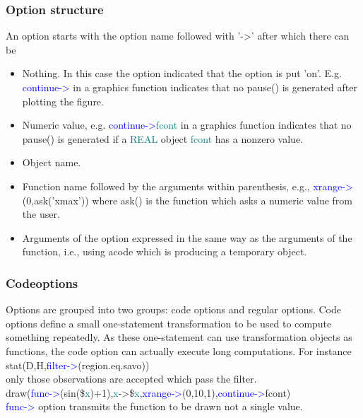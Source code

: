 {\subsubsection{Option structure} 
\label{optionstructure} 
An option starts with the option name 
followed with '->' after which there can be 
\begin{itemize} 
\item Nothing. In this case the option indicated that the option is put 'on'. E.g. 
\textcolor{blue}{continue->} in a graphics function indicates that no \textcolor{VioletRed}{pause}() is generated after plotting the figure. 
\item Numeric value, e.g. \textcolor{blue}{continue->}\textcolor{teal}{fcont} in a graphics function 
indicates that no \textcolor{VioletRed}{pause}() is generated if a \textcolor{teal}{REAL} object \textcolor{teal}{fcont} has a nonzero value. 
 
\item Object name. 
\item Function name followed by the arguments within parenthesis, e.g., 
\textcolor{blue}{xrange->}(0,\textcolor{VioletRed}{ask}('xmax')) where \textcolor{VioletRed}{ask}() is the function which asks a numeric value from the user. 
\item Arguments of the option expressed in the same way as the arguments of the function, i.e., 
using acode which is producing a temporary object. 
\end{itemize} 
\subsubsection{Codeoptions} 
\label{codeoption} 
Options are grouped into two groups: code options and regular options. 
Code options 
define a small one-statement transformation to be used to compute something repeatedly. 
As these one-statement can use transformation objects as functions, the code option can actually 
execute long computations. For instance \\ 
\textcolor{VioletRed}{stat}(D,H,\textcolor{blue}{filter->}(region.eq.savo)) \\ 
only those observations are accepted which pass the filter.\\ 
\textcolor{VioletRed}{draw}(\textcolor{blue}{func->}(\textcolor{VioletRed}{sin}(\$\textcolor{teal}{x})+1),\textcolor{teal}{x}->\$\textcolor{teal}{x},\textcolor{blue}{xrange->}(0,10,1),\textcolor{blue}{continue->}fcont)\\ 
\textcolor{blue}{func->} option 
transmits the function to be drawn not a single value. 
}
